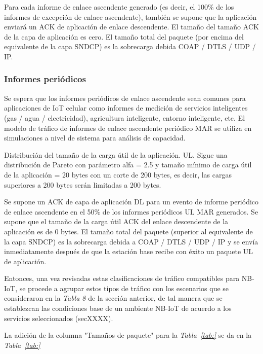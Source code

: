 Para cada informe de enlace ascendente generado (es decir, el 100\% de los informes de excepción de enlace ascendente), también se supone que la aplicación enviará un ACK de aplicación de enlace descendente. El tamaño del tamaño ACK de la capa de aplicación es cero. El tamaño total del paquete (por encima del equivalente de la capa SNDCP) es la sobrecarga debida COAP / DTLS / UDP / IP.\newline

\subsubsection{Informes periódicos}

Se espera que los informes periódicos de enlace ascendente sean comunes para aplicaciones de IoT celular como informes de medición de servicios inteligentes (gas / agua / electricidad), agricultura inteligente, entorno inteligente, etc. El modelo de tráfico de informes de enlace ascendente periódico MAR se utiliza en simulaciones a nivel de sistema para análisis de capacidad.\newline

Distribución del tamaño de la carga útil de la aplicación. UL. Sigue una distribución de Pareto con parámetro alfa = 2.5 y tamaño mínimo de carga útil de la aplicación = 20 bytes con un corte de 200 bytes, es decir, las cargas superiores a 200 bytes serán limitadas a 200 bytes.\newline

Se supone un ACK de capa de aplicación DL para un evento de informe periódico de enlace ascendente en el 50\% de los informes periódicos UL MAR generados. Se supone que el tamaño de la carga útil ACK del enlace descendente de la aplicación es de 0 bytes. El tamaño total del paquete (superior al equivalente de la capa SNDCP) es la sobrecarga debida a COAP / DTLS / UDP / IP y se envía inmediatamente después de que la estación base recibe con éxito un paquete UL de aplicación.\newline

Entonces, una vez revisadas estas clasificaciones de tráfico compatibles para NB-IoT, se procede a agrupar estos tipos de tráfico con los escenarios que se consideraron en la \textit{Tabla 8} de la sección anterior, de tal manera que se establezcan las condiciones base de un ambiente NB-IoT de acuerdo a los servicios seleccionados (secXXXX).\newline

La adición de la columna "Tamaños de paquete" para la \textit{Tabla~\ref{tab:}} se da en la \textit{Tabla~\ref{tab:}}\newline

